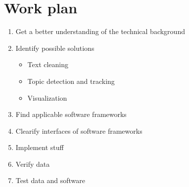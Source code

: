 \section{Work plan}\label{sec:plan}


\begin{enumerate}
	\item Get a better understanding of the technical background
	\item Identify possible solutions
	\begin{itemize}
	  \item Text cleaning
		\item Topic detection and tracking
		\item Visualization
	\end{itemize}
	\item Find applicable software frameworks
	\item Clearify interfaces of software frameworks
	\item Implement stuff
	\item Verify data
	\item Test data and software
\end{enumerate}
